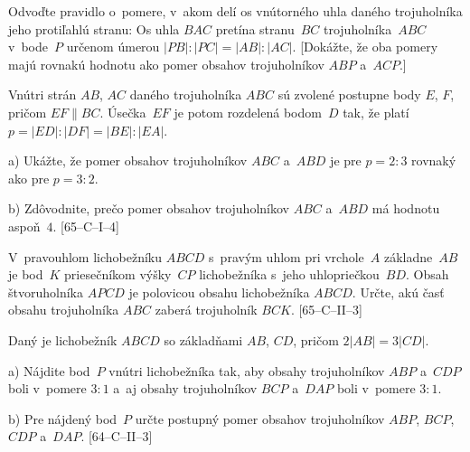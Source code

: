 {Odvoďte pravidlo o~pomere, v~akom delí os vnútorného uhla
daného trojuholníka jeho protiľahlú stranu: Os uhla $BAC$ pretína stranu~$BC$ trojuholníka~$ABC$ v~bode~$P$ určenom úmerou $|PB|:|PC|=|AB|:|AC|$.
[Dokážte, že oba pomery majú rovnakú hodnotu ako pomer obsahov
trojuholníkov $ABP$ a~$ACP$.]

\D
Vnútri strán $AB$, $AC$ daného trojuholníka $ABC$ sú zvolené postupne
body $E$, $F$, pričom $EF \parallel BC$. Úsečka~$EF$
je potom rozdelená bodom~$D$ tak, že platí
$p = |ED|:|DF| = |BE|:|EA|$.
\item{a)} Ukážte, že pomer obsahov trojuholníkov $ABC$ a~$ABD$ je pre $p=2:3$ rovnaký
ako pre $p=3:2$.
\item{b)} Zdôvodnite, prečo pomer obsahov trojuholníkov $ABC$ a~$ABD$ má hodnotu
aspoň~$4$. [65--C--I--4]

V~pravouhlom lichobežníku $ABCD$ s~pravým uhlom pri vrchole~$A$ základne~$AB$ je
bod~$K$ priesečníkom výšky~$CP$ lichobežníka s~jeho uhlopriečkou~$BD$.
Obsah štvoruholníka $APCD$ je polovicou obsahu lichobežníka
$ABCD$. Určte, akú časť obsahu trojuholníka $ABC$ zaberá trojuholník $BCK$.
[65--C--II--3]

Daný je lichobežník $ABCD$ so základňami $AB$, $CD$, pričom $2|AB|=3|CD|$.
\item{a)}
Nájdite bod~$P$ vnútri lichobežníka tak, aby obsahy trojuholníkov $ABP$
a~$CDP$ boli v~pomere $3:1$ a~aj obsahy trojuholníkov $BCP$ a~$DAP$ boli v~pomere $3:1$.
\item{b)}
Pre nájdený bod~$P$ určte postupný pomer obsahov trojuholníkov $ABP$, $BCP$, $CDP$ a~$DAP$.
[64--C--II--3]
}

